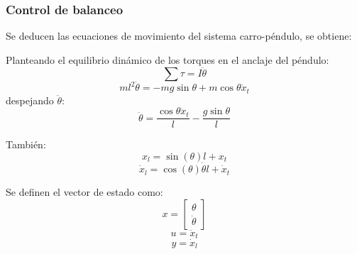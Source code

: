 \documentclass{article}
\begin{document}
            \subsubsection{Control de balanceo}
                Se deducen las ecuaciones de movimiento del sistema carro-péndulo, se obtiene:

                Planteando el equilibrio dinámico de los torques en el anclaje del péndulo:
                \begin{equation}
                    \sum \tau = I \ddot{\theta}
                \end{equation}
                \begin{equation}
                    m l^2 \ddot{\theta} = - m g \sin{\theta} + m \cos{\theta} \ddot{x}_t
                \end{equation}
                despejando \(\ddot{\theta}\):
                \begin{equation}
                    \ddot{\theta} = \frac{\cos{\theta} \ddot{x}_t}{l} - \frac{g \sin{\theta}}{l}
                \end{equation}

                También:
                \begin{equation}
                    x_l = \sin(\theta) l + x_t
                \end{equation}
                \begin{equation}
                    \dot{x}_l = \cos(\theta) \dot{\theta} l + \dot{x}_t
                \end{equation}

                Se definen el vector de estado como:
                \begin{equation}
                    x = \begin{bmatrix}
                        \theta \\
                        \dot{\theta}
                    \end{bmatrix}
                \end{equation}
                \begin{equation}
                    u = \ddot{x}_t
                \end{equation}
                \begin{equation}
                    y = \dot{x}_l
                \end{equation}
\end{document}
